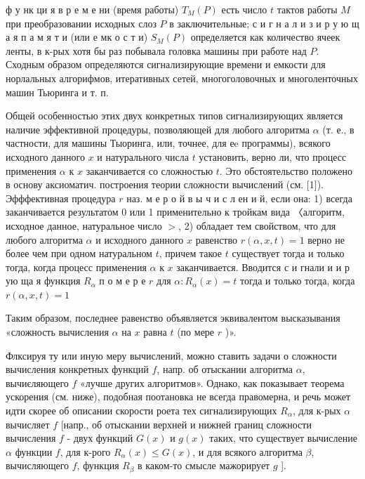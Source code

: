 \documentclass[10pt]{article}
\begin{document}
ф у нк ци я в р е м е ни (время работы) $T_{M}(P)$ есть число $t$ тактов работы $M$ при преобразовании исходных слоз $P$ в заключительные; с и г н а л и з и р у ю щ а я п а м я т и (или е мк о с т и) $S_{M}(P)$ определяется как количество ячеек ленты, в к-рых хотя бы раз побывала головка машины при работе над $P$. Сходным образом определяются сигнализирующие времени и емкости для норлальных алгорифмов, итеративных сетей, многоголовочных и многоленточных машин Тьюринга и т. п.



Общей особенностью этих двух конкретных типов сигнализирующих является наличие эффективной процедуры, позволяющей для любого алгоритма $\alpha$ (т. е., в частности, для машины Тыоринга, или, точнее, для еe программы), всякого исходного данного $x$ и натурального числа $t$ установить, верно ли, что процесс применения $\alpha$ к $x$ заканчивается со сложностью $t$. Это обстоятельство положено в основу аксиоматич. построения теории сложности вычислений (см. [1]). Эфффективная процедура $r$ наз. м е р о й в ы ч и с л ен и й, если она: 1) всегда заканчивается результатом 0 или 1 применительно к тройкам вида 〈алгоритм, исходное данное, натуральное число $>$, 2) обладает тем свойством, что для любого алгоритма $\alpha$ и исходного данного $x$ равенство $r(\alpha, x, t)=1$ верно не более чем при одном натуральном $t$, причем такое $t$ существует тогда и только тогда, когда процесс применения $\alpha$ к $x$ заканчивается. Вводится с и гнали и и р ую ща я функция $R_{\alpha}$ п о м е р е $r$ для $\alpha: R_{\alpha}(x)=t$ тогда и только тогда, когда $r(\alpha, x, t)=1$



Таким образом, последнее равенство объявляется эквивалентом высказывания «сложность вычисления $\alpha$ на $x$ равна $t$ (по мере $r$ )».



Флксируя ту или иную меру вычислений, можно ставить задачи о сложности вычисления конкретных функций $f$, напр. об отыскании алгоритма $\alpha$, вычиєляющего $f$ «лучше других алгоритмов». Однако, как показывает теорема ускорения (см. ниже), подобная поотановка не всегда правомерна, и речь может идти скорее об описании скорости роета тех сигнализирующих $R_{\alpha}$, для к-рых $\alpha$ вычисляет $f$ [напр., об отыскании верхней и нижней границ сложности вычисления $f$ - двух функций $G(x)$ и $g(x)$ таких, что существует вычисление $\alpha$ функции $f$, для к-рого $R_{\alpha}(x) \leqslant G(x)$, и для всякого алгоритма $\beta$, вычисляющего $f$, функция $R_{\beta}$ в каком-то смысле мажорирует $g$ ].
\end{document}
